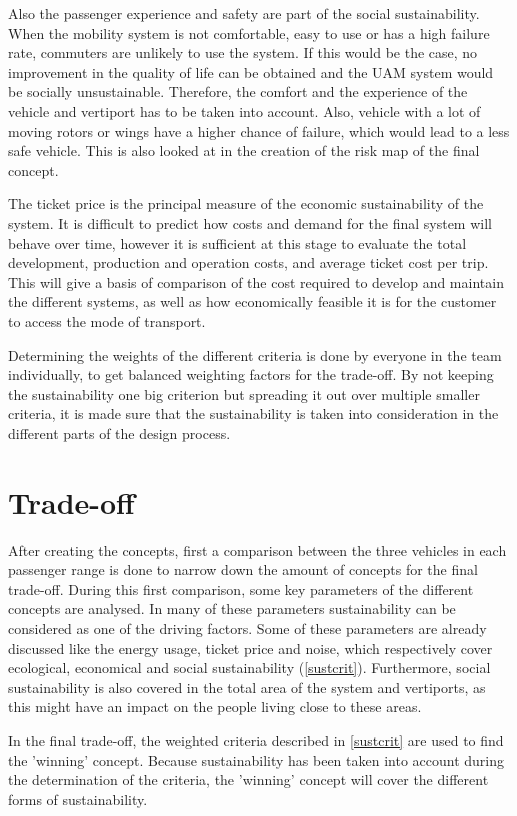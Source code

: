 Also the passenger experience and safety are part of the social sustainability. When the mobility system is not comfortable, easy to use or has a high failure rate, commuters are unlikely to use the system. If this would be the case, no improvement in the quality of life can be obtained and the UAM system would be socially unsustainable. Therefore, the comfort and the experience of the vehicle and vertiport has to be taken into account. Also, vehicle with a lot of moving rotors or wings have a higher chance of failure, which would lead to a less safe vehicle. This is also looked at in the creation of the risk map of the final concept.

The ticket price is the principal measure of the economic sustainability of the system. It is difficult to predict how costs and demand for the final system will behave over time, however it is sufficient at this stage to evaluate the total development, production and operation costs, and average ticket cost per trip. This will give a basis of comparison of the cost required to develop and maintain the different systems, as well as how economically feasible it is for the customer to access the mode of transport. 

Determining the weights of the different criteria is done by everyone in the team individually, to get balanced weighting factors for the trade-off. By not keeping the sustainability one big criterion but spreading it out over multiple smaller criteria, it is made sure that the sustainability is taken into consideration in the different parts of the design process.


\section{Trade-off}
After creating the concepts, first a comparison between the three vehicles in each passenger range is done to narrow down the amount of concepts for the final trade-off. During this first comparison, some key parameters of the different concepts are analysed. In many of these parameters sustainability can be considered as one of the driving factors. Some of these parameters are already discussed like the energy usage, ticket price and noise, which respectively cover ecological, economical and social sustainability (\autoref{sustcrit}). Furthermore, social sustainability is also covered in the total area of the system and vertiports, as this might have an impact on the people living close to these areas. 

In the final trade-off, the weighted criteria described in \autoref{sustcrit} are used to find the 'winning' concept. Because sustainability has been taken into account during the determination of the criteria, the 'winning' concept will cover the different forms of sustainability.

